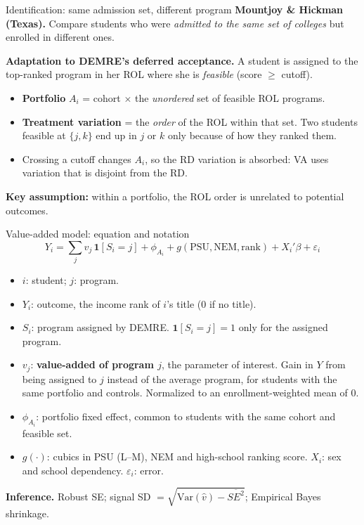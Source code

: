 \documentclass{beamer}
\begin{document}
\begin{frame}{Identification: same admission set, different program}
\small
\textbf{Mountjoy \& Hickman (Texas).} Compare students who were \emph{admitted to the same set of colleges} but enrolled in different ones.

\vspace{0.3cm}
\textbf{Adaptation to DEMRE's deferred acceptance.} A student is assigned to the top-ranked program in her ROL where she is \emph{feasible} (score $\geq$ cutoff).
\begin{itemize}
    \setlength{\itemsep}{6pt}
    \item \textbf{Portfolio} $A_i$ = cohort $\times$ the \emph{unordered} set of feasible ROL programs.
    \item \textbf{Treatment variation} = the \emph{order} of the ROL within that set. Two students feasible at $\{j,k\}$ end up in $j$ or $k$ only because of how they ranked them.
    \item Crossing a cutoff changes $A_i$, so the RD variation is absorbed: VA uses variation that is disjoint from the RD.
\end{itemize}

\vspace{0.3cm}
\textbf{Key assumption:} within a portfolio, the ROL order is unrelated to potential outcomes.
\end{frame}

\begin{frame}[label=va-model]{Value-added model: equation and notation}
\small
\[
Y_i=\sum_j v_j\,\mathbf{1}[S_i=j]+\phi_{A_i}+g(\text{PSU},\text{NEM},\text{rank})+X_i'\beta+\varepsilon_i
\]
\vspace{-0.1cm}
\begin{itemize}
    \setlength{\itemsep}{3pt}
    \item $i$: student; $j$: program.
    \item $Y_i$: outcome, the income rank of $i$'s title (0 if no title).
    \item $S_i$: program assigned by DEMRE. $\mathbf{1}[S_i=j]=1$ only for the assigned program.
    \item $v_j$: \textbf{value-added of program $j$}, the parameter of interest. Gain in $Y$ from being assigned to $j$ instead of the average program, for students with the same portfolio and controls. Normalized to an enrollment-weighted mean of 0.
    \item $\phi_{A_i}$: portfolio fixed effect, common to students with the same cohort and feasible set.
    \item $g(\cdot)$: cubics in PSU (L--M), NEM and high-school ranking score. $X_i$: sex and school dependency. $\varepsilon_i$: error.
\end{itemize}
\vspace{0.1cm}
\footnotesize
\textbf{Inference.} Robust SE; signal SD $=\sqrt{\mathrm{Var}(\hat v)-\overline{SE^2}}$; Empirical Bayes shrinkage.
\end{frame}
\end{document}

